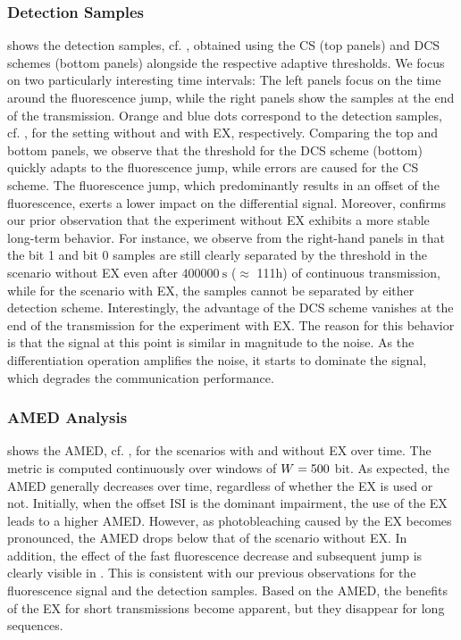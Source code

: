 \subsubsection{Detection Samples}\label{sssec:detection_samples}
\scaleSubsubsectionBelow
%
\noindent {} shows the detection samples, cf. , obtained using the \ac{CS} (top panels) and \ac{DCS} schemes (bottom panels) alongside the respective adaptive thresholds. We focus on two particularly interesting time intervals: The left panels focus on the time around the fluorescence jump, while the right panels show the samples at the end of the transmission. Orange and blue dots correspond to the detection samples, cf. , for the setting without and with \ac{EX}, respectively. Comparing the top and bottom panels, we observe that the threshold for the \ac{DCS} scheme (bottom) quickly adapts to the fluorescence jump, while errors are caused for the \ac{CS} scheme. The fluorescence jump, which predominantly results in an offset of the fluorescence, exerts a lower impact on the differential signal. Moreover,  confirms our prior observation that the experiment without \ac{EX} exhibits a more stable long-term behavior. For instance, we observe from the right-hand panels in  that the bit 1 and bit 0 samples are still clearly separated by the threshold in the scenario without \ac{EX} even after $\SI{400000}{\s}$ ($\approx$ 111h) of continuous transmission, while for the scenario with \ac{EX}, the samples cannot be separated by either detection scheme. Interestingly, the advantage of the \ac{DCS} scheme vanishes at the end of the transmission for the experiment with \ac{EX}. The reason for this behavior is that the signal at this point is similar in magnitude to the noise. As the differentiation operation amplifies the noise, it starts to dominate the signal, which degrades the communication performance.
%
\scaleSubsubsection
\subsubsection{AMED Analysis}\label{sssec:amed_long}
\scaleSubsubsectionBelow
%
\noindent {} shows the \ac{AMED}, cf. , for the scenarios with and without \ac{EX} over time. The metric is computed continuously over windows of $W = 500$ bit. As expected, the \ac{AMED} generally decreases over time, regardless of whether the \ac{EX} is used or not. Initially, when the offset \ac{ISI} is the dominant impairment, the use of the \ac{EX} leads to a higher \ac{AMED}. However, as photobleaching caused by the \ac{EX} becomes pronounced, the \ac{AMED} drops below that of the scenario without \ac{EX}. In addition, the effect of the fast fluorescence decrease and subsequent jump is clearly visible in . This is consistent with our previous observations for the fluorescence signal and the detection samples. Based on the \ac{AMED}, the benefits of the \ac{EX} for short transmissions become apparent, but they disappear for long sequences.
%
\scaleSubsubsection
